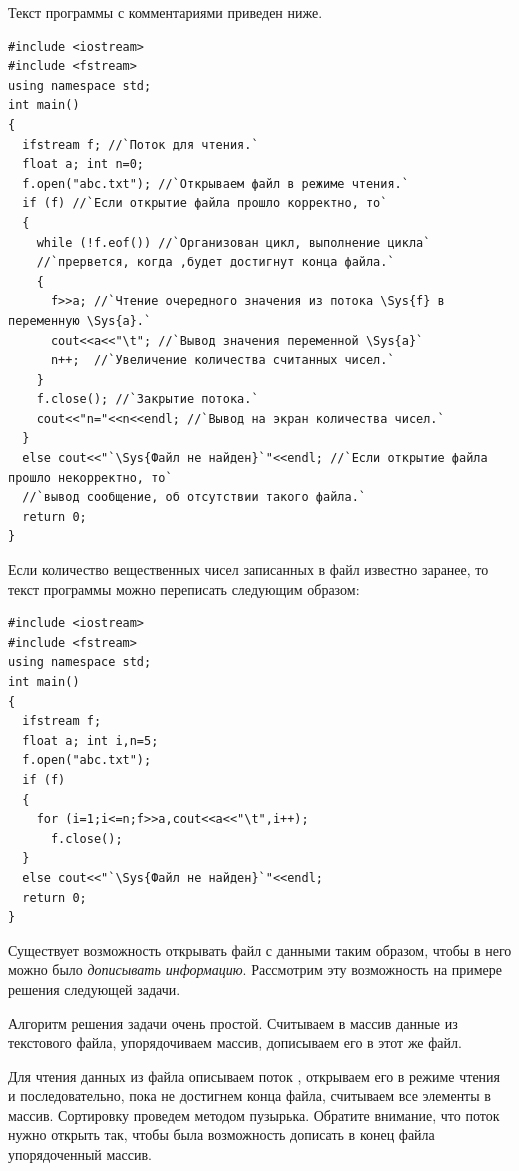 Текст программы с комментариями приведен ниже.
\begin{lstlisting}
#include <iostream>
#include <fstream>
using namespace std;
int main()
{
  ifstream f; //`Поток для чтения.`
  float a; int n=0;
  f.open("abc.txt"); //`Открываем файл в режиме чтения.`
  if (f) //`Если открытие файла	прошло корректно, то`
  {
    while (!f.eof()) //`Организован цикл, выполнение цикла`
    //`прервется, когда ,будет достигнут конца файла.`
    {
      f>>a; //`Чтение очередного значения из потока \Sys{f} в переменную \Sys{a}.`
      cout<<a<<"\t"; //`Вывод значения переменной \Sys{a}` 
      n++;  //`Увеличение количества считанных чисел.`
    }
    f.close(); //`Закрытие потока.`
    cout<<"n="<<n<<endl; //`Вывод на экран количества чисел.`
  }
  else cout<<"`\Sys{Файл не найден}`"<<endl; //`Если открытие файла прошло некорректно, то`
  //`вывод сообщение, об отсутствии такого файла.`
  return 0;
}
\end{lstlisting}

Если количество вещественных чисел записанных в файл известно заранее, то текст программы можно переписать следующим
образом:
\begin{lstlisting}
#include <iostream>
#include <fstream>
using namespace std;
int main()
{
  ifstream f;
  float a; int i,n=5;
  f.open("abc.txt");
  if (f)
  {
    for (i=1;i<=n;f>>a,cout<<a<<"\t",i++);
      f.close();
  }
  else cout<<"`\Sys{Файл не найден}`"<<endl;
  return 0;
}
\end{lstlisting}

Существует возможность открывать файл с данными таким образом, чтобы в него можно было \emph{дописывать
информацию}. Рассмотрим эту возможность на примере решения следующей задачи.


Алгоритм решения задачи очень простой. Считываем в массив данные из текстового файла, упорядочиваем массив, дописываем
его в этот же файл.

Для чтения данных из файла описываем поток , открываем его в режиме чтения и последовательно,
пока не достигнем конца файла, считываем все элементы в массив. Сортировку проведем методом пузырька. Обратите
внимание, что поток нужно открыть так, чтобы была возможность дописать в конец файла упорядоченный массив.

